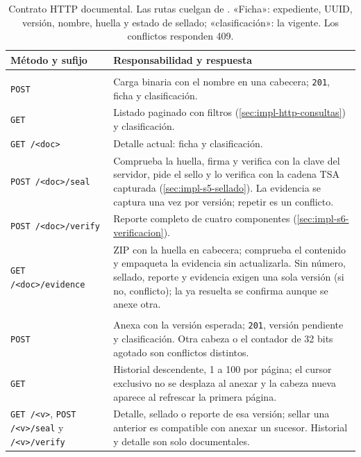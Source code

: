 \begin{table}[!t]
  \centering
  \caption[Contrato HTTP documental.]{Contrato HTTP documental. Las rutas cuelgan de . «Ficha»: expediente, UUID, versión, nombre, huella y estado de sellado; «clasificación»: la vigente. Los conflictos responden 409.}
  \label{tab:impl-http-rutas}\label{tab:impl-http-versiones}\label{tab:impl-http-clasificacion}
  
  \begin{tabularx}{\linewidth}{@{}>{\raggedright\arraybackslash}p{4.3cm} >{\raggedright\arraybackslash}X@{}}
    \toprule
    \textbf{Método y sufijo} & \textbf{Responsabilidad y respuesta} \\
    \midrule
    \multicolumn{2}{@{}l}{\textit{Documento}} \\
    \texttt{POST} & Carga binaria con el nombre en una cabecera; \texttt{201}, ficha y clasificación. \\
    \texttt{GET} & Listado paginado con filtros (\cref{sec:impl-http-consultas}) y clasificación. \\
    \texttt{GET /<doc>} & Detalle actual: ficha y clasificación. \\
    \texttt{POST /<doc>/seal} & Comprueba la huella, firma y verifica con la clave del servidor, pide el sello y lo verifica con la cadena TSA capturada (\cref{sec:impl-s5-sellado}). La evidencia se captura una vez por versión; repetir es un conflicto. \\
    \texttt{POST /<doc>/verify} & Reporte completo de cuatro componentes (\cref{sec:impl-s6-verificacion}). \\
    \texttt{GET /<doc>/evidence} & ZIP con la huella en cabecera; comprueba el contenido y empaqueta la evidencia sin actualizarla. Sin número, sellado, reporte y evidencia exigen una sola versión (si no, conflicto); la ya resuelta se confirma aunque se anexe otra. \\
    \midrule
    \multicolumn{2}{@{}l}{\textit{Versiones, bajo} \texttt{/<doc>/versions}} \\
    \texttt{POST} & Anexa con la versión esperada; \texttt{201}, versión pendiente y clasificación. Otra cabeza o el contador de 32 bits agotado son conflictos distintos. \\
    \texttt{GET} & Historial descendente, 1 a 100 por página; el cursor exclusivo no se desplaza al anexar y la cabeza nueva aparece al refrescar la primera página. \\
    \texttt{GET /<v>}, \texttt{POST} \texttt{/<v>/seal} y \texttt{/<v>/verify} & Detalle, sellado o reporte de esa versión; sellar una anterior es compatible con anexar un sucesor. Historial y detalle son solo documentales. \\

\end{tabularx}
\end{table}
